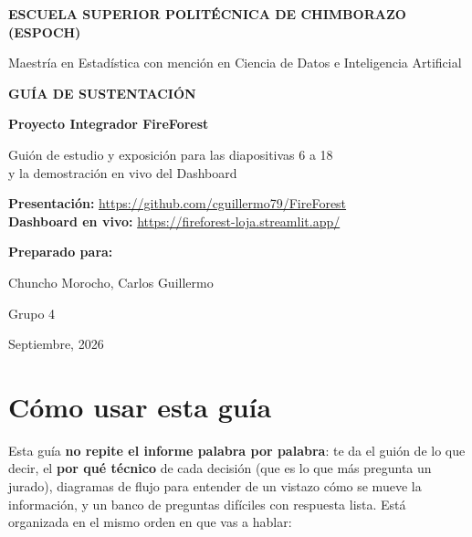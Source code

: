 \documentclass[11pt,a4paper]{article}
\begin{document}
\begin{titlepage}
\centering
\vspace*{1cm}
{\large \textbf{ESCUELA SUPERIOR POLIT\'ECNICA DE CHIMBORAZO (ESPOCH)}\par}
\vspace{0.15cm}
{\large Maestr\'ia en Estad\'istica con menci\'on en Ciencia de Datos e Inteligencia Artificial\par}
\vspace{2cm}

{\Huge\bfseries\color{VerdeOscuro} GU\'IA DE SUSTENTACI\'ON\par}
\vspace{0.5cm}
{\Large\bfseries\color{VerdeMedio} Proyecto Integrador FireForest\par}
\vspace{0.3cm}
{\large Gui\'on de estudio y exposici\'on para las diapositivas 6 a 18\\ y la demostraci\'on en vivo del Dashboard\par}

\vspace{2cm}
\begin{tcolorbox}[breakable, enhanced, colback=VerdePalido, colframe=VerdeOscuro, arc=2mm, width=0.85\textwidth]
\centering
\textbf{Presentaci\'on:} \url{https://github.com/cguillermo79/FireForest}\\[4pt]
\textbf{Dashboard en vivo:} \url{https://fireforest-loja.streamlit.app/}
\end{tcolorbox}

\vspace{2cm}
{\large\bfseries Preparado para:\par}
\vspace{0.2cm}
{\large Chuncho Morocho, Carlos Guillermo\par}
\vspace{0.2cm}
{\large Grupo 4\par}

\vspace{1.5cm}
{\large Septiembre, 2026\par}
\vfill
\end{titlepage}

\section*{C\'omo usar esta gu\'ia}
Esta gu\'ia \textbf{no repite el informe palabra por palabra}: te da el gui\'on de lo que decir, el \textbf{por qu\'e t\'ecnico} de cada decisi\'on (que es lo que m\'as pregunta un jurado), diagramas de flujo para entender de un vistazo c\'omo se mueve la informaci\'on, y un banco de preguntas dif\'iciles con respuesta lista. Est\'a organizada en el mismo orden en que vas a hablar:
\end{document}
